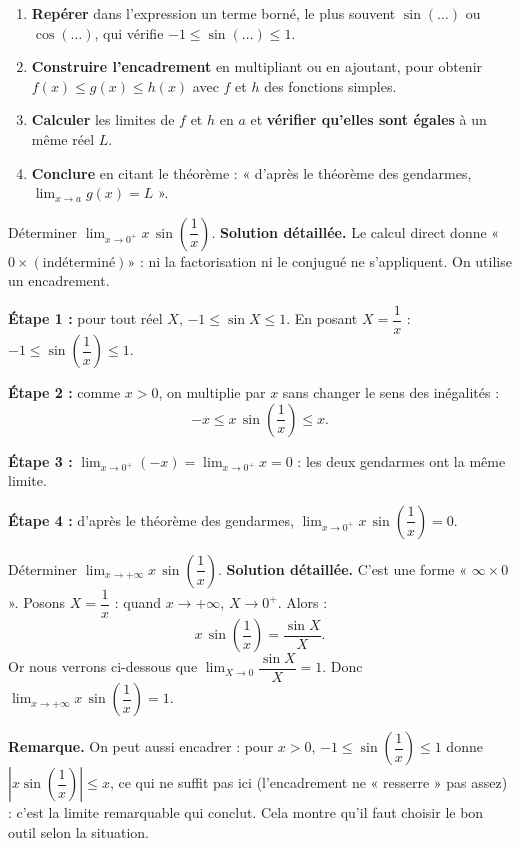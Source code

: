 \documentclass[11pt]{article}
\begin{document}
\begin{methode}
\begin{enumerate}
\item \textbf{Repérer} dans l'expression un terme borné, le plus souvent $\sin(\ldots)$ ou $\cos(\ldots)$, qui vérifie $-1 \le \sin(\ldots) \le 1$.
\item \textbf{Construire l'encadrement} en multipliant ou en ajoutant, pour obtenir $f(x) \le g(x) \le h(x)$ avec $f$ et $h$ des fonctions simples.
\item \textbf{Calculer} les limites de $f$ et $h$ en $a$ et \textbf{vérifier qu'elles sont égales} à un même réel $L$.
\item \textbf{Conclure} en citant le théorème : « d'après le théorème des gendarmes, $\lim_{x\to a} g(x) = L$ ».
\end{enumerate}
\end{methode}

\begin{exoresolu}
Déterminer $\displaystyle\lim_{x\to 0^+} x\,\sin\left(\dfrac{1}{x}\right)$.
\tcblower
\textbf{Solution détaillée.} Le calcul direct donne « $0 \times (\text{indéterminé}) »$ : ni la factorisation ni le conjugué ne s'appliquent. On utilise un encadrement.

\textbf{Étape 1 :} pour tout réel $X$, $-1 \le \sin X \le 1$. En posant $X = \dfrac{1}{x}$ : $-1 \le \sin\left(\dfrac{1}{x}\right) \le 1$.

\textbf{Étape 2 :} comme $x > 0$, on multiplie par $x$ sans changer le sens des inégalités :
\[ -x \le x\,\sin\left(\dfrac{1}{x}\right) \le x. \]

\textbf{Étape 3 :} $\displaystyle\lim_{x\to 0^+}(-x) = \lim_{x\to 0^+} x = 0$ : les deux gendarmes ont la même limite.

\textbf{Étape 4 :} d'après le théorème des gendarmes, $\displaystyle\lim_{x\to 0^+} x\,\sin\left(\dfrac{1}{x}\right) = 0$.
\end{exoresolu}

\begin{exoresolu}
Déterminer $\displaystyle\lim_{x\to +\infty} x\,\sin\left(\dfrac{1}{x}\right)$.
\tcblower
\textbf{Solution détaillée.} C'est une forme « $\infty \times 0$ ». Posons $X = \dfrac{1}{x}$ : quand $x \to +\infty$, $X \to 0^+$. Alors :
\[ x\,\sin\left(\dfrac{1}{x}\right) = \dfrac{\sin X}{X}. \]
Or nous verrons ci-dessous que $\displaystyle\lim_{X\to 0}\dfrac{\sin X}{X} = 1$. Donc $\displaystyle\lim_{x\to +\infty} x\,\sin\left(\dfrac{1}{x}\right) = 1$.

\textbf{Remarque.} On peut aussi encadrer : pour $x > 0$, $-1 \le \sin\left(\dfrac{1}{x}\right) \le 1$ donne $\left|x\sin\left(\dfrac{1}{x}\right)\right| \le x$, ce qui ne suffit pas ici (l'encadrement ne « resserre » pas assez) : c'est la limite remarquable qui conclut. Cela montre qu'il faut choisir le bon outil selon la situation.
\end{exoresolu}
\end{document}
